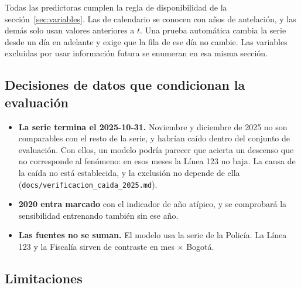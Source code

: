 Todas las predictoras cumplen la regla de disponibilidad de la sección~\ref{sec:variables}. Las de calendario se conocen con años de antelación, y las demás solo usan valores anteriores a $t$. Una prueba automática cambia la serie desde un día en adelante y exige que la fila de ese día no cambie. Las variables excluidas por usar información futura se enumeran en esa misma sección.

\subsection{Decisiones de datos que condicionan la evaluación}\label{sec:decisiones-eval}

\begin{itemize}
  \item \textbf{La serie termina el 2025-10-31.} Noviembre y diciembre de 2025 no son comparables con el resto de la serie, y habrían caído dentro del conjunto de evaluación. Con ellos, un modelo podría parecer que acierta un descenso que no corresponde al fenómeno: en esos meses la Línea 123 no baja. La causa de la caída no está establecida, y la exclusión no depende de ella (\texttt{docs/\allowbreak{}verificacion\_\allowbreak{}caida\_\allowbreak{}2025.md}).
  \item \textbf{2020 entra marcado} con el indicador de año atípico, y se comprobará la sensibilidad entrenando también sin ese año.
  \item \textbf{Las fuentes no se suman.} El modelo usa la serie de la Policía. La Línea 123 y la Fiscalía sirven de contraste en mes $\times$ Bogotá.
\end{itemize}

\subsection{Limitaciones}\label{sec:limitaciones-metodo}

